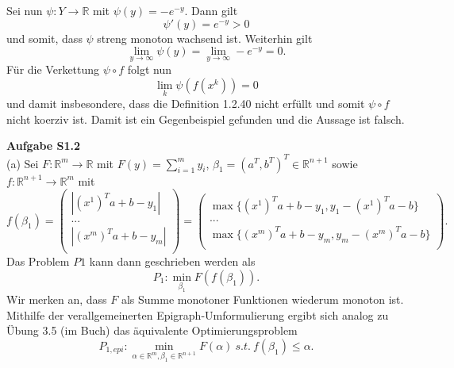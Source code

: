 \documentclass[ngerman, a4paper,12pt]{article}
\begin{document}
Sei nun $\psi : Y \rightarrow \mathbb{R}$  mit $\psi (y) = -e^{-y}$. Dann gilt
\begin{equation*}
\psi ' (y) = e^{-y} > 0
\end{equation*}
und somit, dass $\psi$ streng monoton wachsend ist. Weiterhin gilt 
\begin{equation}
\lim_{y \rightarrow \infty} \psi(y) = \lim_{y \rightarrow \infty} -e^{-y} = 0.
\end{equation}
Für die Verkettung $\psi \circ f$ folgt nun
\begin{equation}
\lim\limits_{k} \psi(f(x^k)) = 0
\end{equation}
und damit insbesondere, dass die Definition 1.2.40 nicht erfüllt und somit $\psi \circ f$ nicht koerziv ist. Damit ist ein Gegenbeispiel gefunden und die Aussage ist falsch. \par
\textbf{Aufgabe S1.2} \\
(a) Sei $F: \mathbb{R}^m \rightarrow \mathbb{R}$ mit $F(y) = \sum_{i=1}^{m}y_i$, $\beta_1 = (a^T, b^T)^T \in \mathbb{R}^{n+1}$ sowie $f: \mathbb{R}^{n+1} \rightarrow \mathbb{R}^m$ mit 
\begin{equation*}
	f(\beta_1) = 
					\begin{pmatrix}
					\left| (x^1)^Ta + b - y_1 \right| \\
					... \\
					\left| (x^m)^Ta + b - y_m \right| \\
					 \end{pmatrix} =
											 \begin{pmatrix}
											 \max\{(x^1)^Ta + b - y_1 , y_1 - (x^1)^Ta - b\} \\
											 ... \\
											 \max\{(x^m)^Ta + b - y_m , y_m - (x^m)^Ta - b\} \\
											 \end{pmatrix}.
\end{equation*}
Das Problem $P1$ kann dann geschrieben werden als
\begin{equation*}
	P_1: \min_{\beta_1} F(f(\beta_1)).
\end{equation*}
Wir merken an, dass $F$ als Summe monotoner Funktionen wiederum monoton ist. Mithilfe der verallgemeinerten Epigraph-Umformulierung ergibt sich analog zu Übung 3.5 (im Buch) das äquivalente Optimierungsproblem
\begin{equation*}
	P_{1, epi}:\min_{\alpha \in \mathbb{R}^m, \beta_1 \in \mathbb{R}^{n+1}} F(\alpha) \ s.t. \ f(\beta_1) \leq \alpha.
\end{equation*}
\end{document}
